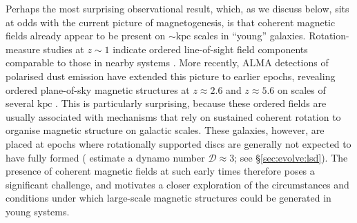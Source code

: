 Perhaps the most surprising observational result, which, as we discuss below, sits at odds with the current picture of magnetogenesis, is that coherent magnetic fields already appear to be present on $\sim\mathrm{kpc}$ scales in ``young'' galaxies. Rotation-measure studies at $z \sim 1$ indicate ordered line-of-sight field components comparable to those in nearby systems \citep{bernet2008strong, sur2018faraday}. More recently, ALMA detections of polarised dust emission have extended this picture to earlier epochs, revealing ordered plane-of-sky magnetic structures at $z \approx 2.6$ and $z \approx 5.6$ on scales of several $\mathrm{kpc}$ \citep{geach2023polarized, chen2024kiloparsec}. This is particularly surprising, because these ordered fields are usually associated with mechanisms that rely on sustained coherent rotation to organise magnetic structure on galactic scales. These galaxies, however, are placed at epochs where rotationally supported discs are generally not expected to have fully formed (\citealt{geach2023polarized} estimate a dynamo number $\mathcal{D} \approx 3$; see \S\ref{sec:evolve:lsd}). The presence of coherent magnetic fields at such early times therefore poses a significant challenge, and motivates a closer exploration of the circumstances and conditions under which large-scale magnetic structures could be generated in young systems.
